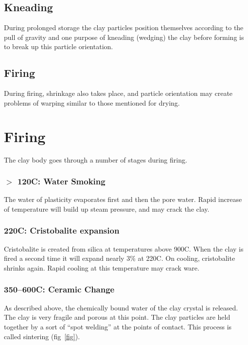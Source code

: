 \subsection{Kneading}
During prolonged storage the clay particles position themselves according to 
the pull of gravity and one purpose of kneading (wedging) the clay before 
forming is to break up this particle orientation.
\subsection{Firing}
During firing, shrinkage also takes place, and particle orientation may create 
problems of warping similar to those mentioned for drying.
\section{Firing}
The clay body goes through a number of stages during firing.
\subsubsection{$>$ 120\degree C: Water Smoking}
The water of plasticity evaporates first and then the pore water. Rapid 
increase of temperature will build up steam pressure, and may crack the clay.
\subsubsection{220\degree C: Cristobalite expansion}
Cristobalite is created from silica at temperatures above 900\degree C. When 
the clay is fired a second time it will expand nearly 3\% at 220\degree C. On 
cooling, cristobalite shrinks again. Rapid cooling at this temperature may 
crack ware.
\subsubsection{350--600\degree C: Ceramic Change}
As described above, the chemically bound water of the clay crystal is released. 
The clay is very fragile and porous at this point. The clay particles are held 
together by a sort of ``spot welding'' at the points of contact. This process 
is called sintering (fig~\ref{fig}).
